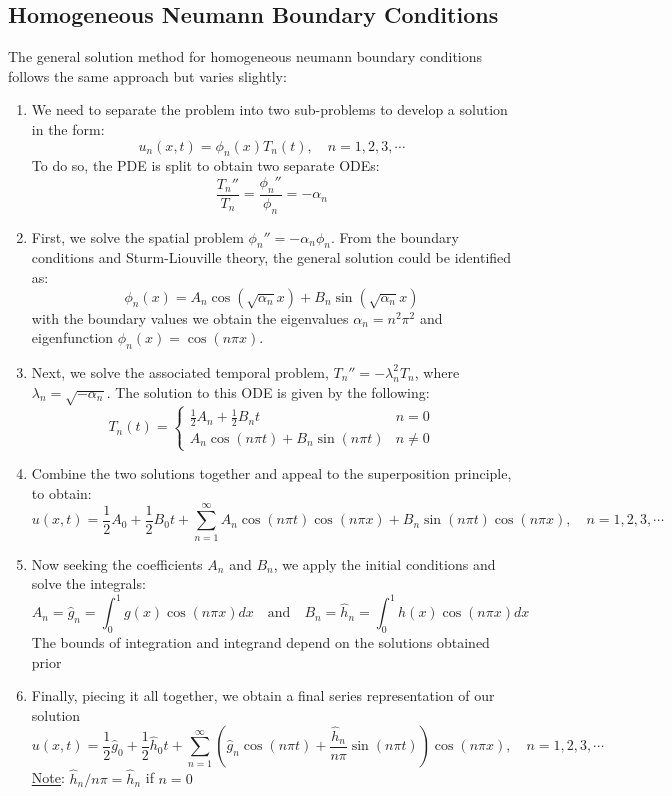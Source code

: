 \documentclass[11pt]{article}
\begin{document}
\subsection{Homogeneous Neumann Boundary Conditions}
The general solution method for homogeneous neumann boundary conditions follows the same approach but varies slightly: 
\begin{enumerate}
\item We need to separate the problem into two sub-problems to develop a solution in the form: 
$$ u_n(x,t) = \phi_n(x) T_n(t), \quad n=1,2,3, \cdots$$
To do so, the PDE is split to obtain two separate ODEs:
$$ \frac{T_n''}{T_n} = \frac{\phi_n''}{\phi_n} = -\alpha_n$$
\item First, we solve the spatial problem $\phi_n'' = -\alpha_n \phi_n$.  From the boundary conditions and Sturm-Liouville theory, the general solution could be identified as:
$$ \phi_n(x) = A_n \cos ( \sqrt{\alpha_n} x) + B_n \sin ( \sqrt{\alpha_n} x)$$
with the boundary values we obtain the eigenvalues $\alpha_n = n^2 \pi ^2$ and eigenfunction $\phi_n(x) = \cos(n \pi x) $.
\item Next, we solve the associated temporal problem, $T_n'' = -\lambda_n^2 T_n$, where $\lambda_n = \sqrt{-\alpha_n}$. The solution to this ODE is given by the following: 
\[ T_n(t) =  
 \begin{cases} 
      \frac{1}{2} A_n + \frac{1}{2} B_nt  & n=0 \\
      A_n \cos ( n \pi t) + B_n \sin ( n\pi t) & n\neq 0
   \end{cases}
\]
\item Combine the two solutions together and appeal to the superposition principle, to obtain:
$$u(x,t) =    \frac{1}{2} A_0 + \frac{1}{2} B_0t + \sum_{n=1}^{\infty} A_n \cos (n \pi t) \cos (n \pi x) + B_n \sin (n \pi t) \cos(n \pi x), \quad n=1,2,3, \cdots$$
\item Now seeking the coefficients $A_n$ and $B_n$, we apply the initial conditions and solve the integrals:
$$ A_n = \hat{g}_n = \int_0^1 g(x) \cos(n \pi x)dx \quad \text{and} \quad B_n = \hat{h}_n= \int_0^1 h(x) \cos(n \pi x)dx $$
The bounds of integration and integrand depend on the solutions obtained prior
\item Finally, piecing it all together, we obtain a final series representation of our solution
$$u(x,t) =   \frac{1}{2} \hat{g}_0 + \frac{1}{2} \hat{h}_0t + \sum_{n=1}^{\infty} \left( \hat{g}_n \cos(n \pi t) + \frac{\hat{h}_n}{n \pi} \sin (n \pi t) \right)\cos(n\pi x), \quad n=1,2,3, \cdots$$
\underline{Note}: $\hat{h}_n / n\pi = \hat{h}_n$ if $n=0$
\end{enumerate}
\pagebreak
\end{document}
